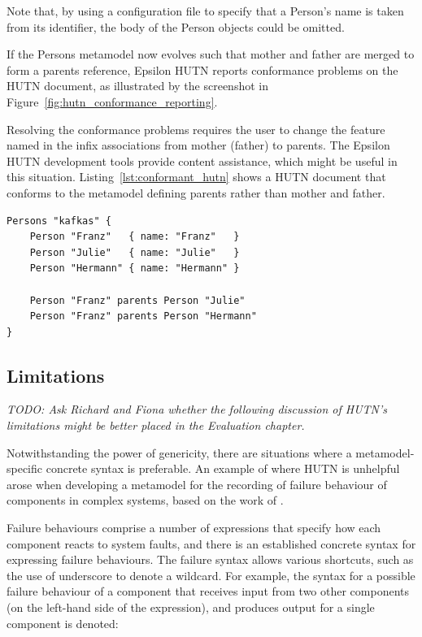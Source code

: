 Note that, by using a configuration file to specify that a Person's name is taken from its identifier, the body of the Person objects could be omitted.

If the Persons metamodel now evolves such that mother and father are merged to form a parents reference, Epsilon HUTN reports conformance problems on the HUTN document, as illustrated by the screenshot in Figure~\ref{fig:hutn_conformance_reporting}.


Resolving the conformance problems requires the user to change the feature named in the infix associations from mother (father) to parents. The Epsilon HUTN development tools provide content assistance, which might be useful in this situation. Listing~\ref{lst:conformant_hutn} shows a HUTN document that conforms to the metamodel defining parents rather than mother and father.

\begin{lstlisting}[caption=Exemplar HUTN document., label=lst:conformant_hutn, language=HutnFamilies]
Persons "kafkas" {
    Person "Franz"   { name: "Franz"   }
    Person "Julie"   { name: "Julie"   }
    Person "Hermann" { name: "Hermann" }
    
    Person "Franz" parents Person "Julie"
    Person "Franz" parents Person "Hermann"
}
\end{lstlisting}


\subsection{Limitations}
\emph{TODO: Ask Richard and Fiona whether the following discussion of HUTN's limitations might be better placed in the Evaluation chapter.}

Notwithstanding the power of genericity, there are situations where a metamodel-specific concrete syntax is preferable. An example of where HUTN is unhelpful arose when developing a metamodel for the recording of failure behaviour of components in complex systems, based on the work of \cite{wallace05modular}.

Failure behaviours comprise a number of expressions that specify how each component reacts to system faults, and there is an established concrete syntax for expressing failure behaviours. The failure syntax allows various shortcuts, such as the use of underscore to denote a wildcard. For example, the syntax for a possible failure behaviour of a component that receives input from two other components (on the left-hand side of the expression), and produces output for a single component is denoted:

